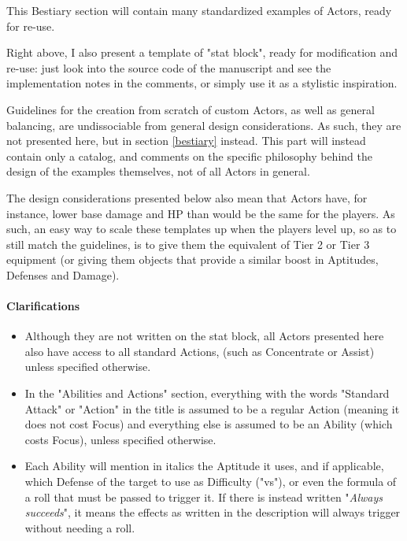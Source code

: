 This Bestiary section will contain many standardized examples of Actors, ready for re-use.

Right above, I also present a template of "stat block", ready for modification and re-use: just look into the source code of the manuscript and see the implementation notes in the comments, or simply use it as a stylistic inspiration.

\begin{rpg-examplebox}
    Guidelines for the creation from scratch of custom Actors, as well as general balancing, are undissociable from general design considerations. As such, they are not presented here, but in section \ref{bestiary} instead. This part will instead contain only a catalog, and comments on the specific philosophy behind the design of the examples themselves, not of all Actors in general.
\end{rpg-examplebox}

The design considerations presented below also mean that Actors have, for instance, lower base damage and HP than would be the same for the players. As such, an easy way to scale these templates up when the players level up, so as to still match the guidelines, is to give them the equivalent of Tier 2 or Tier 3 equipment (or giving them objects that provide a similar boost in Aptitudes, Defenses and Damage).

\paragraph{Clarifications}

\begin{itemize}
    \item Although they are not written on the stat block, all Actors presented here also have access to all standard Actions, (such as Concentrate or Assist) unless specified otherwise.
    \item In the "Abilities and Actions" section, everything with the words "Standard Attack" or "Action" in the title is assumed to be a regular Action (meaning it does not cost Focus) and everything else is assumed to be an Ability (which costs Focus), unless specified otherwise.
    \item Each Ability will mention in italics the Aptitude it uses, and if applicable, which Defense of the target to use as Difficulty ("vs"), or even the formula of a roll that must be passed to trigger it. If there is instead written "\textit{Always succeeds}", it means the effects as written in the description will always trigger without needing a roll.
\end{itemize}



